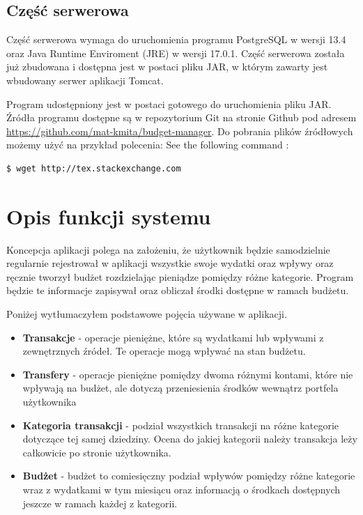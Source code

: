 \documentclass[shortabstract,inz]{iithesis}
\begin{document}
\subsection*{Część serwerowa}
Część serwerowa wymaga do uruchomienia programu PostgreSQL \citep{pgsql} w wersji 13.4 oraz Java Runtime Enviroment (JRE) w wersji 17.0.1.
Część serwerowa została już zbudowana i dostępna jest w postaci pliku JAR, w którym zawarty jest wbudowany serwer aplikacji Tomcat.

Program udostępniony jest w postaci gotowego do uruchomienia pliku JAR. Źródła programu dostępne są w repozytorium Git na stronie Github pod adresem \url{https://github.com/mat-kmita/budget-manager}. Do pobrania plików źródłowych możemy użyć na przykład polecenia:
\noindent See the following command :
\begin{lstlisting}[language=bash]
  $ wget http://tex.stackexchange.com
\end{lstlisting}
\section{Opis funkcji systemu}
Koncepcja aplikacji polega na założeniu, że użytkownik będzie samodzielnie regularnie rejestrował w aplikacji wszystkie swoje wydatki oraz wpływy oraz ręcznie tworzył budżet rozdzielając pieniądze pomiędzy różne kategorie. Program będzie te informacje zapisywał oraz obliczał środki dostępne w ramach budżetu.

Poniżej wytłumaczyłem podstawowe pojęcia używane w aplikacji.
\begin{itemize}
	\item \textbf{Transakcje} - operacje pieniężne, które są wydatkami lub wpływami z zewnętrznych źródeł. Te operacje mogą wpływać na stan budżetu.
	\item \textbf{Transfery} - operacje pieniężne pomiędzy dwoma różnymi kontami, które nie wpływają na budżet, ale dotyczą przeniesienia środków wewnątrz portfela użytkownika
		\item \textbf{Kategoria transakcji} - podział wszystkich transakcji na różne kategorie dotyczące tej samej dziedziny. Ocena do jakiej kategorii należy transakcja leży całkowicie po stronie użytkownika.
	\item \textbf{Budżet} - budżet to comiesięczny podział wpływów pomiędzy różne kategorie wraz z wydatkami w tym miesiącu oraz informacją o środkach dostępnych jeszcze w ramach każdej z kategorii.

\end{itemize}
\end{document}
